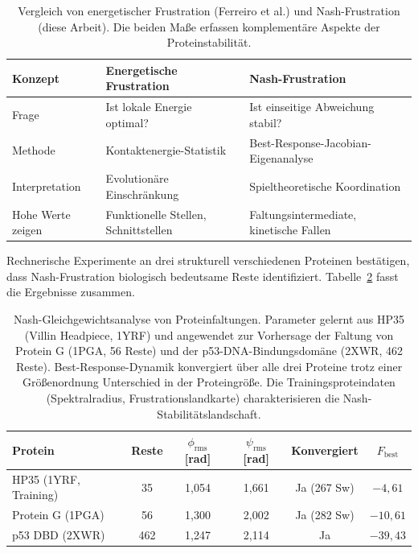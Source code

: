 \documentclass[12pt,a4paper]{article}
\theoremstyle{remark}
\begin{document}
\begin{table}[htbp]
\centering
\caption{Vergleich von energetischer Frustration (Ferreiro et al.) und Nash-Frustration (diese Arbeit). Die beiden Ma\ss{}e erfassen komplement\"are Aspekte der Proteinstabilit\"at.}
\label{tab:frustration-comparison}
\begin{tabular}{lll}
\toprule
\textbf{Konzept} & \textbf{Energetische Frustration} & \textbf{Nash-Frustration} \\
\midrule
Frage & Ist lokale Energie optimal? & Ist einseitige Abweichung stabil? \\
Methode & Kontaktenergie-Statistik & Best-Response-Jacobian-Eigenanalyse \\
Interpretation & Evolution\"are Einschr\"ankung & Spieltheoretische Koordination \\
Hohe Werte zeigen & Funktionelle Stellen, Schnittstellen & Faltungsintermediate, kinetische Fallen \\
\bottomrule
\end{tabular}
\end{table}

Rechnerische Experimente an drei strukturell verschiedenen Proteinen best\"atigen, dass Nash-Frustration biologisch bedeutsame Reste identifiziert. Tabelle~\ref{tab:nash-results} fasst die Ergebnisse zusammen.

\begin{table}[htbp]
\centering
\caption{Nash-Gleichgewichtsanalyse von Proteinfaltungen. Parameter gelernt aus HP35 (Villin Headpiece, 1YRF) und angewendet zur Vorhersage der Faltung von Protein G (1PGA, 56 Reste) und der p53-DNA-Bindungsdom\"ane (2XWR, 462 Reste). Best-Response-Dynamik konvergiert \"uber alle drei Proteine trotz einer Gr\"o\ss{}enordnung Unterschied in der Proteingr\"o\ss{}e. Die Trainingsproteindaten (Spektralradius, Frustrationslandkarte) charakterisieren die Nash-Stabilit\"atslandschaft.}
\label{tab:nash-results}
\begin{tabular}{lccccc}
\toprule
\textbf{Protein} & \textbf{Reste} & $\phi_{\text{rms}}$ [rad] & $\psi_{\text{rms}}$ [rad] & \textbf{Konvergiert} & $F_{\text{best}}$ \\
\midrule
HP35 (1YRF, Training) & 35 & 1{,}054 & 1{,}661 & Ja (267 Sw) & $-4{,}61$ \\
Protein G (1PGA) & 56 & 1{,}300 & 2{,}002 & Ja (282 Sw) & $-10{,}61$ \\
p53 DBD (2XWR) & 462 & 1{,}247 & 2{,}114 & Ja & $-39{,}43$ \\
\bottomrule
\end{tabular}
\end{table}
\end{document}
